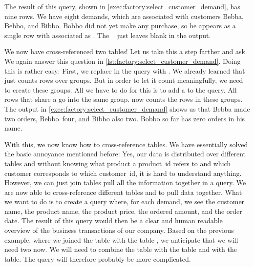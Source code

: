 The result of this query, shown in \cref{exec:factory:select_customer_demand}, has nine rows.
We have eight demands, which are associated with customers Bebba, Bebbo, and Bibbo.
Bobbo did not yet make any purchase, so he appears as a single row with  associated as .
The \psql\  just leaves  blank in the output.

We now have cross-referenced two tables!
Let us take this a step farther and ask 
We again answer this question in \cref{lst:factory:select_customer_demand}.
Doing this is rather easy:
First, we replace  in the query with .
We already learned that  just counts rows over groups.
But in order to let it count meaningfully, we need to create these groups.
All we have to do for this is to add a  to the query.
All rows that share a  go into the same group.
 now counts the rows in these groups.
The output in \cref{exec:factory:select_customer_demand} shows us that Bebba made two orders, Bebbo~four, and Bibbo also two.
Bobbo so far has zero orders in his name.

With this, we now know how to cross-reference tables.
We have essentially solved the basic annoyance mentioned before:
Yes, our data is distributed over different tables and without knowing what product a product~id refers to and which customer corresponds to which customer~id, it is hard to understand anything.
However, we can just join tables pull all the information together in a query.%
%
\FloatBarrier%
\endhsection%
%
%
%
%
%
%
We are now able to cross-reference different tables and to pull data together.
What we want to do is to create a query where, for each demand, we see the customer name, the product name, the product price, the ordered amount, and the order date.
The result of this query would then be a clear and human readable overview of the business transactions of our company.
Based on the previous example, where we joined the table  with the table , we anticipate that we will need two  now.
We will need to combine the  table with the  table and with the  table.
The query will therefore probably be more complicated.

